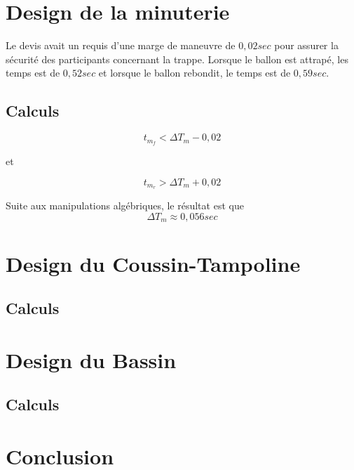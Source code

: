 \documentclass[12pt]{article}
\begin{document}
\section{Design de la minuterie}
Le devis avait un requis d'une marge de maneuvre de $0,02sec$ pour assurer la sécurité des participants concernant la trappe. Lorsque le ballon est attrapé, les temps est de $0,52sec$ et lorsque le ballon rebondit, le temps est de $0,59sec$.
\subsection{Calculs}
\begin{equation}
t_{m_f} < \Delta T_m - 0,02
\end{equation}
\begin{center}
et
\end{center}
\begin{equation}
t_{m_r} > \Delta T_m + 0,02
\end{equation}

Suite aux manipulations algébriques, le résultat est que 
\begin{equation}
\Delta T_m \approx 0,056 sec
\end{equation}

\section{Design du Coussin-Tampoline}
\subsection{Calculs}

\section{Design du Bassin}
\subsection{Calculs}

\section{Conclusion}
\end{document}
